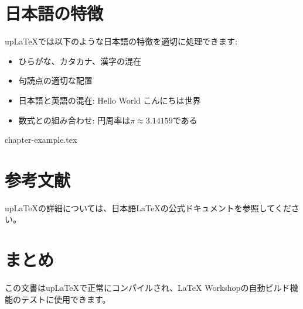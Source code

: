 \documentclass[a4paper,12pt]{ujarticle}
\begin{document}
\section{日本語の特徴}

upLaTeXでは以下のような日本語の特徴を適切に処理できます:

\begin{itemize}
    \item ひらがな、カタカナ、漢字の混在
    \item 句読点の適切な配置
    \item 日本語と英語の混在: Hello World こんにちは世界
    \item 数式との組み合わせ: 円周率は$\pi \approx 3.14159$である
\end{itemize}

{chapter-example.tex}

\section{参考文献}

upLaTeXの詳細については、日本語LaTeXの公式ドキュメントを参照してください。




\section{まとめ}

この文書はupLaTeXで正常にコンパイルされ、LaTeX Workshopの自動ビルド機能のテストに使用できます。
\end{document}
